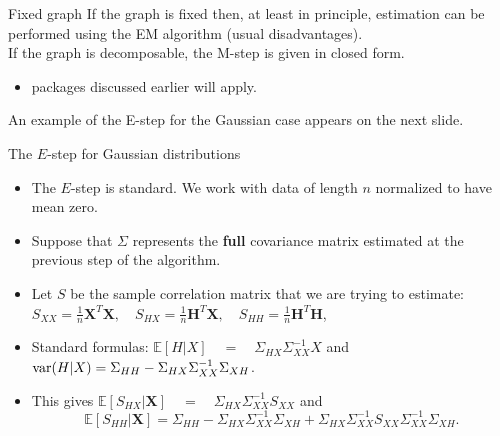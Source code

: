 \documentclass[dvipsnames,aspectratio=169]{beamer} %
\newcommand{\E}{\mathbb{E}}
\newcommand{\bs}{\boldsymbol}
\begin{document}
\begin{frame}{Fixed graph}
	If the graph is fixed then, at least in principle, estimation can be performed using the \alert{EM algorithm} (usual disadvantages).\\[.5cm]
	If the  graph is decomposable, the M-step is given in closed form.
	\begin{itemize}
		\item packages discussed earlier will apply.\\[.5cm]
	\end{itemize}
	An example of the E-step for the Gaussian case appears on the next slide.\\[.5cm]
\end{frame}

\begin{frame}[label=Estep]{The $E$-step for Gaussian distributions}
\begin{itemize}
\item The $E$-step is standard. We work with data of length $n$ normalized to have mean zero.  
\item Suppose that $\Sigma$ represents the \textbf{full} covariance matrix estimated at the previous step of the algorithm.
\item Let $S$ be the sample correlation matrix that we are trying to estimate: 
$S_{XX}=\frac{1}{n} \bs X^T \bs X,\quad S_{HX}=\frac{1}{n} \bs H^T \bs X,\quad S_{HH}=\frac{1}{n} \bs H^T \bs H$,
\item Standard formulas: $\E[H|X]\quad =\quad \Sigma_{HX}\Sigma_{XX}^{-1}X$ and ${\rm var}(H|X)=\Sigma_{HH}-\Sigma_{HX}\Sigma_{XX}^{-1}\Sigma_{XH}$.
\item This gives $\E[S_{HX}|\bs X]\quad =\quad \Sigma_{HX}\Sigma_{XX}^{-1}S_{XX}$
and
$$\E[S_{HH}|\bs X]=\Sigma_{HH}-\Sigma_{HX}\Sigma_{XX}^{-1}\Sigma_{XH}+\Sigma_{HX}\Sigma_{XX}^{-1}S_{XX}\Sigma_{XX}^{-1}\Sigma_{XH}.$$
\end{itemize}
\end{frame}
\end{document}
